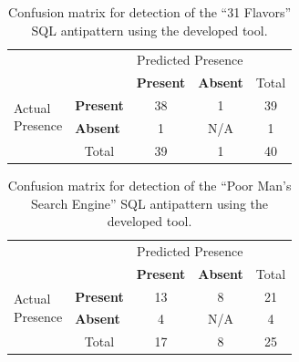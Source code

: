 \begin{table}[H]
    \centering
    \caption{Confusion matrix for detection of the “31 Flavors” SQL antipattern using the developed tool.}
    \label{tab:31FlavorsConfusion}
    \begin{tabular}{l|l|c|c|c}
        \multicolumn{2}{c}{}&\multicolumn{2}{c}{Predicted Presence}&\\
        \cline{3-4}
        \multicolumn{2}{c|}{}&\textbf{Present}&\textbf{Absent}&\multicolumn{1}{c}{Total}\\
        \cline{2-4}
        \multirow{2}{1.5cm}{Actual\\Presence}& \textbf{Present} & 38 & 1 & 39\\
        \cline{2-4}
        & \textbf{Absent} & 1 & N/A & 1\\
        \cline{2-4}
        \multicolumn{1}{c}{} & \multicolumn{1}{c}{Total} & \multicolumn{1}{c}{39} & \multicolumn{1}{c}{1} & \multicolumn{1}{c}{40}\\
    \end{tabular}
\end{table}

\begin{table}[H]
    \centering
    \caption{Confusion matrix for detection of the “Poor Man's Search Engine” SQL antipattern using the developed tool.}
    \label{tab:poorMansSearchEngineConfusion}
    \begin{tabular}{l|l|c|c|c}
        \multicolumn{2}{c}{}&\multicolumn{2}{c}{Predicted Presence}&\\
        \cline{3-4}
        \multicolumn{2}{c|}{}&\textbf{Present}&\textbf{Absent}&\multicolumn{1}{c}{Total}\\
        \cline{2-4}
        \multirow{2}{1.5cm}{Actual\\Presence}& \textbf{Present} & 13 & 8 & 21\\
        \cline{2-4}
        & \textbf{Absent} & 4 & N/A & 4\\
        \cline{2-4}
        \multicolumn{1}{c}{} & \multicolumn{1}{c}{Total} & \multicolumn{1}{c}{17} & \multicolumn{1}{c}{8} & \multicolumn{1}{c}{25}\\
    \end{tabular}
\end{table}

